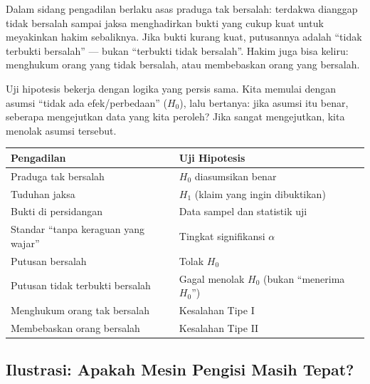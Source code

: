 \documentclass[
  indonesian,
  letterpaper,
]{book}
\newcounter{none} %
\begin{document}
Dalam sidang pengadilan berlaku asas praduga tak bersalah: terdakwa
dianggap tidak bersalah sampai jaksa menghadirkan bukti yang cukup kuat
untuk meyakinkan hakim sebaliknya. Jika bukti kurang kuat, putusannya
adalah ``tidak terbukti bersalah'' --- bukan ``terbukti tidak
bersalah''. Hakim juga bisa keliru: menghukum orang yang tidak bersalah,
atau membebaskan orang yang bersalah.

Uji hipotesis bekerja dengan logika yang persis sama. Kita memulai
dengan asumsi ``tidak ada efek/perbedaan'' (\(H_0\)), lalu bertanya:
jika asumsi itu benar, seberapa mengejutkan data yang kita peroleh? Jika
sangat mengejutkan, kita menolak asumsi tersebut.

{\def\LTcaptype{none} %
\begin{longtable}[]{@{}
  >{\raggedright\arraybackslash}p{}
  >{\raggedright\arraybackslash}p{}@{}}
\toprule\noalign{}
\begin{minipage}[b]{\linewidth}\raggedright
Pengadilan
\end{minipage} & \begin{minipage}[b]{\linewidth}\raggedright
Uji Hipotesis
\end{minipage} \\
\midrule\noalign{}
\endhead
\bottomrule\noalign{}
\endlastfoot
Praduga tak bersalah & \(H_0\) diasumsikan benar \\
Tuduhan jaksa & \(H_1\) (klaim yang ingin dibuktikan) \\
Bukti di persidangan & Data sampel dan statistik uji \\
Standar ``tanpa keraguan yang wajar'' & Tingkat signifikansi
\(\alpha\) \\
Putusan bersalah & Tolak \(H_0\) \\
Putusan tidak terbukti bersalah & Gagal menolak \(H_0\) (bukan
``menerima \(H_0\)'') \\
Menghukum orang tak bersalah & Kesalahan Tipe I \\
Membebaskan orang bersalah & Kesalahan Tipe II \\
\end{longtable}
}

\subsection{Ilustrasi: Apakah Mesin Pengisi Masih
Tepat?}\label{ilustrasi-apakah-mesin-pengisi-masih-tepat}
\end{document}
